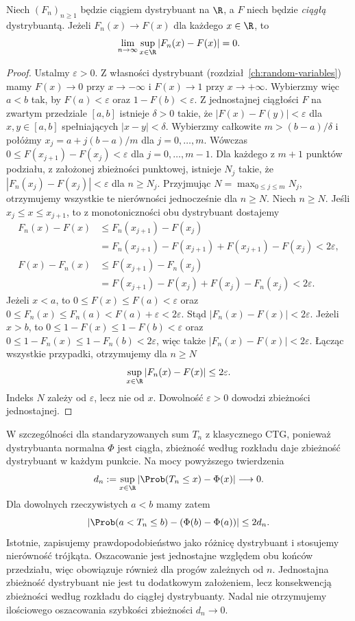 \begin{twierdzenie}
Niech $(F_n)_{n\geq1}$ będzie ciągiem dystrybuant
na $\R$, a $F$ niech będzie \emph{ciągłą} dystrybuantą.
Jeżeli $F_n(x)\to F(x)$ dla każdego $x\in\R$,
to
\[
\lim_{n\to\infty}\sup_{x\in\R}|F_n(x)-F(x)|=0.
\]
\end{twierdzenie}
\begin{proof}
Ustalmy $\varepsilon>0$. Z własności dystrybuant
(rozdział~\ref{ch:random-variables}) mamy
$F(x)\to0$ przy $x\to-\infty$ i $F(x)\to1$
przy $x\to+\infty$. Wybierzmy więc $a<b$ tak,
by $F(a)<\varepsilon$ oraz $1-F(b)<\varepsilon$.
Z jednostajnej ciągłości $F$ na zwartym przedziale
$[a,b]$ istnieje $\delta>0$ takie, że
$|F(x)-F(y)|<\varepsilon$ dla $x,y\in[a,b]$
spełniających $|x-y|<\delta$.
Wybierzmy całkowite $m>(b-a)/\delta$ i połóżmy
$x_j=a+j(b-a)/m$ dla $j=0,\ldots,m$.
Wówczas $0\leq F(x_{j+1})-F(x_j)<\varepsilon$
dla $j=0,\ldots,m-1$.
Dla każdego z $m+1$ punktów podziału, z założonej
zbieżności punktowej, istnieje $N_j$ takie, że
$|F_n(x_j)-F(x_j)|<\varepsilon$ dla $n\geq N_j$.
Przyjmując $N=\max_{0\leq j\leq m}N_j$,
otrzymujemy wszystkie te nierówności jednocześnie
dla $n\geq N$.
Niech $n\geq N$. Jeśli $x_j\leq x\leq x_{j+1}$,
to z monotoniczności obu dystrybuant dostajemy
\[
\begin{aligned}
F_n(x)-F(x)
&\leq F_n(x_{j+1})-F(x_j)\\
&=F_n(x_{j+1})-F(x_{j+1})
  +F(x_{j+1})-F(x_j)<2\varepsilon,\\
F(x)-F_n(x)
&\leq F(x_{j+1})-F_n(x_j)\\
&=F(x_{j+1})-F(x_j)+F(x_j)-F_n(x_j)
<2\varepsilon.
\end{aligned}
\]
Jeżeli $x<a$, to
$0\leq F(x)\leq F(a)<\varepsilon$ oraz
$0\leq F_n(x)\leq F_n(a)<F(a)+\varepsilon<2\varepsilon$.
Stąd $|F_n(x)-F(x)|<2\varepsilon$.
Jeżeli $x>b$, to
$0\leq1-F(x)\leq1-F(b)<\varepsilon$ oraz
$0\leq1-F_n(x)\leq1-F_n(b)<2\varepsilon$,
więc także $|F_n(x)-F(x)|<2\varepsilon$.
Łącząc wszystkie przypadki, otrzymujemy dla $n\geq N$
\[
\sup_{x\in\R}|F_n(x)-F(x)|\leq2\varepsilon.
\]
Indeks $N$ zależy od $\varepsilon$, lecz nie od $x$.
Dowolność $\varepsilon>0$ dowodzi zbieżności jednostajnej.
\end{proof}

\begin{uwaga}
W szczególności dla standaryzowanych sum $T_n$
z klasycznego CTG, ponieważ dystrybuanta normalna
$\Phi$ jest ciągła, zbieżność według rozkładu daje
zbieżność dystrybuant w każdym punkcie. Na mocy
powyższego twierdzenia
\[
d_n:=\sup_{x\in\R}|\Prob(T_n\leq x)-\Phi(x)|
\longrightarrow0.
\]
Dla dowolnych rzeczywistych $a<b$ mamy zatem
\[
|\Prob(a<T_n\leq b)-(\Phi(b)-\Phi(a))|
\leq 2d_n.
\]
Istotnie, zapisujemy prawdopodobieństwo jako różnicę
dystrybuant i stosujemy nierówność trójkąta.
Oszacowanie jest jednostajne względem obu końców
przedziału, więc obowiązuje również dla progów
zależnych od $n$. Jednostajna zbieżność dystrybuant
nie jest tu dodatkowym założeniem, lecz konsekwencją
zbieżności według rozkładu do ciągłej dystrybuanty.
Nadal nie otrzymujemy ilościowego oszacowania
szybkości zbieżności $d_n\to0$.
\end{uwaga}

